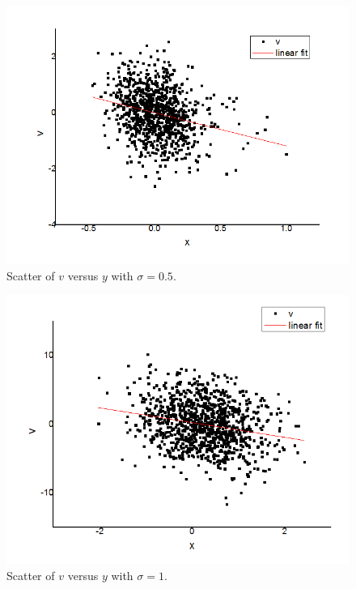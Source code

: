 \documentclass[11pt,a4paper]{article}
\begin{document}
\begin{figure}
    \centering
    \includegraphics[scale=0.75]{figure2-02}
    \caption{Scatter of $v$ versus $y$ with $\sigma=0.5$.}
    \label{fig:3}
\end{figure}

\begin{figure}
    \centering
    \includegraphics[scale=0.75]{figure2-01}
    \caption{Scatter of $v$ versus $y$ with $\sigma=1$.}
    \label{fig:4}
\end{figure}
\end{document}
